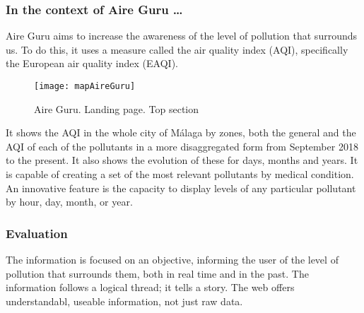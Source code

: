 \subsubsection*{In the context of Aire Guru \ldots} 

Aire Guru aims to increase the awareness of the level of pollution that surrounds us. To do this, it uses a measure called
the air quality index (AQI), specifically the European air quality index (EAQI).
\newpage
\begin{figure}[ht]
    \centering
    \texttt{[image: mapAireGuru]}
    \caption{Aire Guru. Landing page. Top section}
\end{figure}

It shows the AQI in the whole city of Málaga by zones, both the general and the AQI of each of the 
pollutants in a more disaggregated form from September 2018 to the present. It also shows the evolution
of these for days, months and years.
It is capable of creating a set of the most relevant pollutants by medical condition. An innovative feature is the capacity to display levels of any particular pollutant by hour, day, month, or year. 

\subsubsection*{Evaluation}  

\begin{itemize}
    \done The information is focused on an objective, informing the user of the level of pollution that surrounds them, both  in real time
    and in the past.
    \done The information follows a logical thread; it tells a story.
    \done The web offers understandabl, useable information, not just raw data.
\end{itemize}